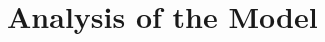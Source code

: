 \documentclass[12pt]{article} %
\theoremstyle{definition}
\begin{document}



\section{Analysis of the Model}\label{section analysis}
\end{document}
